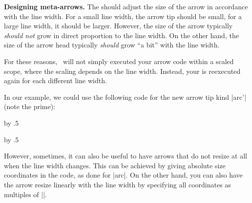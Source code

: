 \begin{command}{\pgfarrowsdeclare{}}
  \medskip
  \textbf{Designing meta-arrows.}
  The  should adjust the size of the arrow in
  accordance with the line width. For a small line width, the arrow
  tip should be small, for a large line width, it should be
  larger. However, the size of the arrow typically \emph{should not}
  grow in direct proportion to the line width. On the other hand, the
  size of the arrow head typically \emph{should} grow ``a bit'' with
  the line width.

  For these reasons, \pgfname\ will not simply executed your arrow
  code within a scaled scope, where the scaling depends on the line
  width. Instead, your  is reexecuted again for
  each different line width.

  In our example, we could use the following code for the new arrow
  tip kind |arc'| (note the prime):
\begin{codeexample}
\newdimen\arrowsize
{}
{
  \arrowsize=0.2pt
  \advance\arrowsize by .5\pgflinewidth
  \pgfsetdash{}{0pt} %
  \pgfsetroundjoin   %
  \pgfsetroundcap    %
  \pgfpathmoveto{\pgfpoint{-4\arrowsize}{4\arrowsize}}
  \pgfusepathqstroke
}
\end{codeexample}
\newdimen\arrowsize
{}
{
  \arrowsize=0.2pt
  \advance\arrowsize by .5\pgflinewidth
  \pgfsetdash{}{0pt} %
  \pgfsetroundjoin   %
  \pgfsetroundcap    %
  \pgfpathmoveto{\pgfpoint{-4\arrowsize}{4\arrowsize}}
  \pgfusepathqstroke
  \pgfpathmoveto{\pgfpointorigin}
  \pgfusepathqstroke
}
\begin{codeexample}[]
\end{codeexample}

  However, sometimes, it can also be useful to have arrows that do not
  resize at all when the line width changes. This can be achieved by
  giving absolute size coordinates in the code, as done for |arc|. On
  the other hand, you can also have the arrow resize linearly with the
  line width by specifying all coordinates as multiples of
  |\pgflinewidth|.


\end{command}
